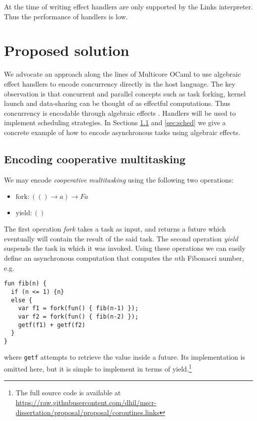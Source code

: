 \documentclass[preprint,10pt,numbers]{sigplanconf}
\begin{document}
At the time of writing effect handlers are only supported by the Links interpreter. Thus the performance of handlers is low.

  \section{Proposed solution}\label{sec:proposedsolution}
We advocate an approach along the lines of Multicore OCaml to use algebraic effect handlers to encode concurrency directly in the host language. 
The key observation is that concurrent and parallel concepts such as task forking, kernel launch and data-sharing can be thought of as effectful computations. Thus concurrency is encodable through algebraic effects \cite{Bauer2015,Dolan2015}. Handlers will be used to implement scheduling strategies. In Sections \ref{sec:eff} and \ref{sec:sched} we give a concrete example of how to encode asynchronous tasks using algebraic effects.

\subsection{Encoding cooperative multitasking}\label{sec:eff}
We may encode \emph{cooperative multitasking} using the following two operations:
\begin{itemize}
  \item $\text{fork} : (() \to a) \to F a$
  \item $\text{yield} : ()$
\end{itemize}
The first operation \emph{fork} takes a task as input, and returns a future which eventually will contain the result of the said task. The second operation \emph{yield} suspends the task in which it was invoked. Using these operations we can easily define an asynchronous computation that computes the $n$th Fibonacci number, e.g. 
\begin{lstlisting}[style={links},caption={}]
fun fib(n) {
  if (n <= 1) {n}
  else {
    var f1 = fork(fun() { fib(n-1) });
    var f2 = fork(fun() { fib(n-2) });
    getf(f1) + getf(f2)
  }
}
\end{lstlisting}
where \texttt{getf} attempts to retrieve the value inside a future. Its implementation is omitted here, but it is simple to implement in terms of yield.\footnote{The full source code is available at \url{https://raw.githubusercontent.com/dhil/mscr-dissertation/proposal/proposal/coroutines.links}} 
\end{document}
